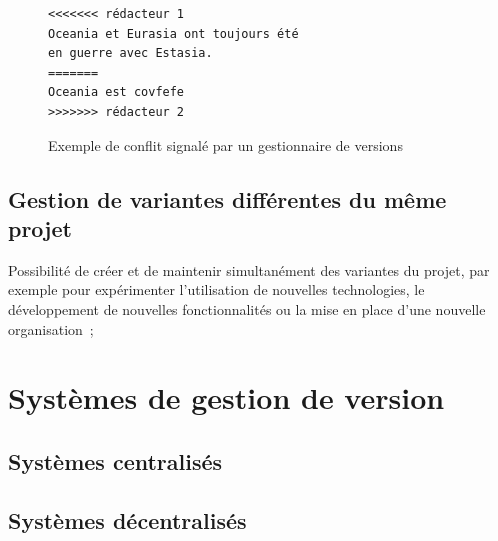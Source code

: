 \begin{figure}[h!]
\begin{minipage}{7cm}
\begin{lstlisting}
<<<<<<< rédacteur 1
Oceania et Eurasia ont toujours été
en guerre avec Estasia.
=======
Oceania est covfefe
>>>>>>> rédacteur 2
\end{lstlisting}
\end{minipage}
\caption{Exemple de conflit signalé par un gestionnaire de
  versions\label{fig:conflitTxt}}
\end{figure}


\subsection{Gestion de variantes différentes du même projet} %

Possibilité de créer et de maintenir simultanément des variantes du
projet, par exemple pour expérimenter l'utilisation de nouvelles
technologies, le développement de nouvelles fonctionnalités ou la mise
en place d'une nouvelle organisation~;

\section{Systèmes de gestion de version} %


\subsection{Systèmes centralisés} %

\subsection{Systèmes décentralisés} %

